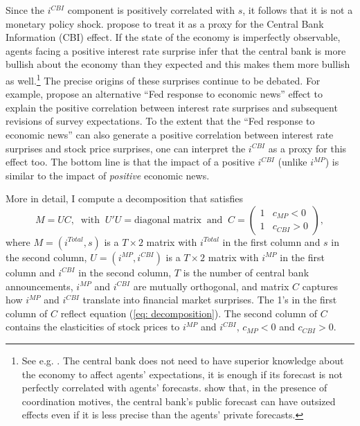 \documentclass[a4paper,12pt]{article}
\begin{document}
Since the $i^{CBI}$ component is positively correlated with $s$, it follows that it is not a monetary policy shock.
\cite{Jarocinski_Karadi_2020} propose to treat it as a proxy for the Central Bank Information (CBI) effect.
If the state of the economy is imperfectly observable, agents facing a positive interest rate surprise
infer that the central bank is more bullish about the economy than they expected 
and this makes them more bullish as well.\footnote{See e.g. \cite{Romer_Romer_2000,Melosi_2017,Nakamura_Steinsson_2018}.
The central bank does not need to have superior knowledge about the economy to affect
agents' expectations, it is enough if its forecast is not perfectly correlated with agents' forecasts. \cite{Morris_Shin_2002} show that, in the presence of coordination motives,
the central bank's public forecast can have outsized effects even if it is less precise than the agents' private forecasts.}
The precise origins of these surprises continue to be debated.
For example, \cite{Bauer_Swanson_2020} propose
an alternative ``Fed response to economic news'' effect to explain the positive correlation between interest rate surprises and subsequent revisions of survey expectations. 
To the extent that the ``Fed response to economic news'' can also generate
a positive correlation between interest rate surprises and stock price surprises, 
one can interpret the $i^{CBI}$ as a proxy for this effect too.
The bottom line is that the impact of a positive $i^{CBI}$ (unlike $i^{MP}$) is similar to the impact of \emph{positive} economic news.

More in detail, I compute a decomposition that satisfies
\begin{equation}\label{eq: rotational}
M = UC,\;\;\text{with}\;\;  U'U=\text{diagonal matrix} \;\; \text{and}\;\;
C=\begin{pmatrix}1&c_{MP}<0\\1&c_{CBI}>0\end{pmatrix},
\end{equation}
where $M=(i^{Total},s)$ is a $T \times 2$ matrix with $i^{Total}$ in the first column and $s$ in the second column,
$U=\left(i^{MP},i^{CBI}\right)$ is a $T \times 2$ matrix with $i^{MP}$ in the first column and $i^{CBI}$ in the second column, $T$ is the number of central bank announcements,
$i^{MP}$ and $i^{CBI}$ are mutually orthogonal, and matrix $C$ captures how $i^{MP}$ and $i^{CBI}$ translate
into financial market surprises. The 1's in the first column of $C$ reflect equation (\ref{eq: decomposition}).
The second column of $C$ contains the elasticities of stock prices to $i^{MP}$ and $i^{CBI}$, $c_{MP}<0$ and $c_{CBI}>0$.
\end{document}
